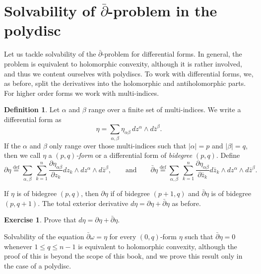\documentclass[12pt,openany]{book}
\newcommand{\abs}[1]{\left\lvert {#1} \right\rvert}
\newcommand{\myindex}[1]{#1\index{#1}}
\theoremstyle{plain}
\theoremstyle{remark}
\theoremstyle{definition}
\newtheorem{defn}[thm]{Definition}
\newenvironment{exbox}{%
    \def\FrameCommand{\vrule width 1pt \relax\hspace{10pt}}%
    \MakeFramed{\advance\hsize-\width\FrameRestore}%
}{%
    \endMakeFramed
}
\theoremstyle{exercise}
\newtheorem{exercise}{Exercise}[section]
\theoremstyle{example}
\begin{document}
\section{Solvability of \texorpdfstring{$\bar{\partial}$}{dbar}-problem in the polydisc} \label{sec:dbarpoly}

Let us tackle solvability of the $\bar{\partial}$-problem for differential forms.
In general, the problem is equivalent to holomorphic convexity, although
it is rather involved, and thus we content ourselves with polydiscs.
To work with differential forms, we, as before, split the derivatives
into the holomorphic and antiholomorphic parts.  For higher order forms
we work with multi-indices.

\begin{defn} \label{defn:danddbarform}
Let $\alpha$ and $\beta$ range over a finite set of multi-indices.
We write a differential form as
\begin{equation*}
\eta =
\sum_{\alpha,\beta}
\eta_{\alpha \beta} \, dz^\alpha \wedge d\bar{z}^\beta  .
\end{equation*}
If the $\alpha$ and $\beta$ only range over those multi-indices such that
$\abs{\alpha}=p$ and $\abs{\beta}=q$, then we call $\eta$
a \emph{\myindex{$(p,q)$-form}} or a differential form of
\emph{\myindex{bidegree}} $(p,q)$.
Define
%
%
\begin{equation*}
\partial \eta \overset{\text{def}}{=}
\sum_{\alpha,\beta}
\,
\sum_{k=1}^n
\frac{\partial \eta_{\alpha \beta}}{\partial z_k} dz_k \wedge dz^\alpha
\wedge d\bar{z}^\beta ,
\qquad \text{and} \qquad
\bar{\partial} \eta \overset{\text{def}}{=}
\sum_{\alpha,\beta}
\,
\sum_{k=1}^n
\frac{\partial \eta_{\alpha \beta}}{\partial \bar{z}_k} d\bar{z}_k \wedge dz^\alpha
\wedge d\bar{z}^\beta .
\end{equation*}
\end{defn}

If $\eta$ is of bidegree $(p,q)$, then
$\partial \eta$ if of bidegree $(p+1,q)$ and
$\bar{\partial} \eta$ is of bidegree $(p,q+1)$.
The total exterior derivative $d \eta = \partial \eta + \bar{\partial} \eta$ as before.

\begin{exbox}
\begin{exercise}
Prove that $d \eta = \partial \eta + \bar{\partial} \eta$.
\end{exercise}
\end{exbox}

Solvability of the equation $\bar{\partial} \omega = \eta$ for every $(0,q)$-form
$\eta$ such that $\bar{\partial} \eta = 0$ whenever $1 \leq q \leq n-1$
is equivalent to holomorphic convexity, although
the proof of this is beyond the scope of this book, and we prove
this result only in the case of a polydisc.
\end{document}
